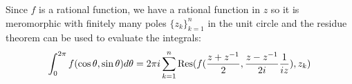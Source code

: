 \documentclass{homework}
\begin{document}
\begin{solution}
                                                                                                                                                                            Since $f$ is a rational function, we have a rational function in $z$ so it is meromorphic with finitely many poles $\{z_k\}_{k=1}^n$ in the unit circle and the residue theorem can be used to evaluate the integrals:
                                                                                                                                                                            \[
                                                                                                                                                                                \int_0^{2\pi} f(\cos \theta, \sin\theta) d\theta =  2\pi i \sum_{k=1}^n \operatorname{Res}(f(\frac{z+z^{-1}}{2},\frac{z-z^{-1}}{2i}\frac{1}{iz} ), z_k)
                                                                                                                                                                                \]
                                                                                                                                                                                \end{solution}
\end{document}
